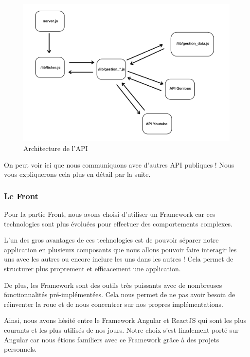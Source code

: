\documentclass[12pt,french]{article}
\begin{document}
\begin{figure}[H]
	\centering
	\includegraphics[scale=0.16]{api.png}
	\caption{Architecture de l'API}
\end{figure}

\medskip

On peut voir ici que nous communiquons avec d'autres \gls{API} publiques ! Nous vous expliquerons cela plus en détail par la suite.

\subsubsection{Le Front}

Pour la partie \gls{Front}, nous avons choisi d'utiliser un \gls{Framework} car ces technologies sont plus évoluées pour effectuer des comportements complexes.

\medskip

L'un des gros avantages de ces technologies est de pouvoir séparer notre application en plusieurs composants que nous allons pouvoir faire interagir les uns avec les autres ou encore inclure les uns dans les autres ! Cela permet de structurer plus proprement et efficacement une application.

\medskip

De plus, les \gls{Framework} sont des outils très puissants avec de nombreuses fonctionnalités pré-implémentées. Cela nous permet de ne pas avoir besoin de réinventer la roue et de nous concentrer sur nos propres implémentations.

\medskip

Ainsi, nous avons hésité entre le \gls{Framework} Angular et ReactJS qui sont les plus courants et les plus utilisés de nos jours. Notre choix s'est finalement porté sur Angular car nous étions familiers avec ce \gls{Framework} grâce à des projets personnels. 
\end{document}
